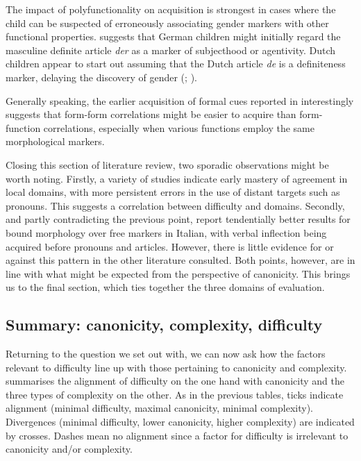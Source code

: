 \documentclass[output=collectionpaper]{langsci/langscibook}
\begin{document}
The impact of polyfunctionality on acquisition is strongest in cases where the child can be suspected of erroneously associating gender markers with other functional properties. \citet{Bittner2002} suggests that German children might initially regard the masculine definite article \textit{der} as a marker of subjecthood or agentivity. Dutch children appear to start out assuming that the Dutch article \textit{de} is a definiteness marker, delaying the discovery of gender (\citealt{Keij2012}; \citealt{Cornips2008}).

Generally speaking, the earlier acquisition of formal cues reported in  interestingly suggests that form-form correlations might be easier to acquire than form-function correlations, especially when various functions employ the same morphological markers.

Closing this section of literature review, two sporadic observations might be worth noting. Firstly, a variety of studies indicate early mastery of agreement in local domains, with more persistent errors in the use of distant targets such as pronouns. This suggests a correlation between difficulty and domains. Secondly, and partly contradicting the previous point, \citet[545]{Pizzuto1992} report tendentially better results for bound morphology over free markers in Italian, with verbal inflection being acquired before pronouns and articles. However, there is little evidence for or against this pattern in the other literature consulted. Both points, however, are in line with what might be expected from the perspective of canonicity. This brings us to the final section, which ties together the three domains of evaluation.

\subsection{Summary: canonicity, complexity, difficulty}
\label{sec:Audr:4.3}

Returning to the question we set out with, we can now ask how the factors relevant to difficulty line up with those pertaining to canonicity and complexity.  summarises the alignment of difficulty on the one hand with canonicity and the three types of complexity on the other. As in the previous tables, ticks indicate alignment (minimal difficulty, maximal canonicity, minimal complexity). Divergences (minimal difficulty, lower canonicity, higher complexity) are indicated by crosses. Dashes mean no alignment since a factor for difficulty is irrelevant to canonicity and/or complexity.
\end{document}
